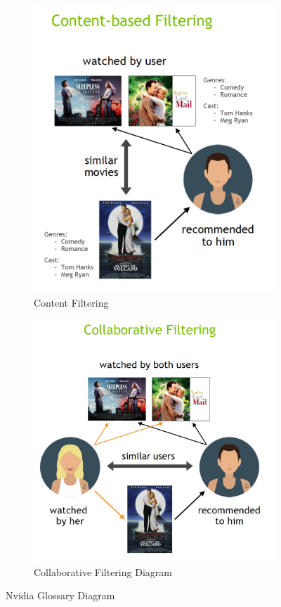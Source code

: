 \begin{figure}[H]
    \centering
    \begin{subfigure}{.5\textwidth}
        \centering
        \includegraphics[width=0.8\linewidth]{assets/content_based_filtering.png}
        \caption{Content Filtering}
        \label{fig:content-filtering}
    \end{subfigure}%
    \begin{subfigure}{.5\textwidth}
        \centering
        \includegraphics[width=0.95\linewidth]{assets/collaborative_filtering.png}
        \caption{Collaborative Filtering Diagram}
        \label{fig:collaborative-filtering}
    \end{subfigure}
    \caption[Nvidia Glossary Diagram]{Nvidia Glossary Diagram \cite{NvidiaRecSys}}
\end{figure}


